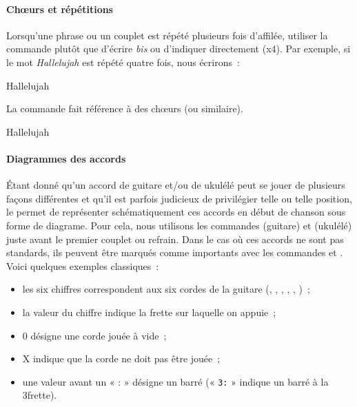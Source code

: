 \paragraph{Ch\oe{}urs et répétitions}
Lorsqu'une phrase ou un couplet est répété plusieurs fois d'affilée,
utiliser la commande  plutôt que d'écrire \emph{bis} ou
d'indiquer directement (x4). Par exemple, si le mot \emph{Hallelujah}
est répété quatre fois, nous écrirons~:

\begin{song}
Hallelujah 
\end{song}

La commande  fait référence à des chœurs (ou
similaire).

\begin{song}
Hallelujah 
\end{song}

\paragraph{Diagrammes des accords}
Étant donné qu'un accord de guitare et/ou de ukulélé peut se jouer de
plusieurs façons différentes et qu'il est parfois judicieux de
privilégier telle ou telle position, le \songbook permet de représenter
schématiquement ces accords en début de chanson sous forme de
diagrame. Pour cela, nous utilisons les commandes 
(guitare) et  (ukulélé) juste avant le premier couplet
ou refrain. Dans le cas où ces accords ne sont pas standards, ils
peuvent être marqués comme importants avec les commandes
 et . Voici quelques exemples
classiques~:

\begin{song}
\end{song}

\begin{itemize}
\item les six chiffres correspondent aux six cordes de la guitare
  (, , , ,
  , )~;
\item la valeur du chiffre indique la frette sur laquelle on
  appuie~;
\item 0 désigne une corde jouée à vide~;
\item X indique que la corde ne doit pas être jouée~;
\item une valeur avant un « : » désigne un barré (« \verb|3:| » indique
  un barré à la 3\ieme frette).
\end{itemize}

